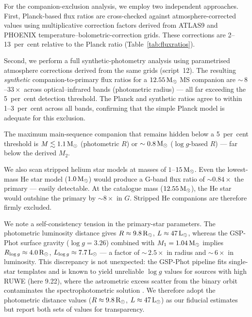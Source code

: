 \documentclass[usenatbib,fleqn]{mnras}
\newcommand{\Msun}{{\rm M}_\odot}
\newcommand{\Lsun}{{\rm L}_\odot}
\newcommand{\Rsun}{{\rm R}_\odot}
\begin{document}
For the companion-exclusion analysis, we employ two independent
approaches.  First, Planck-based flux ratios are cross-checked
against atmosphere-corrected values using multiplicative
correction factors derived from ATLAS9 \citep{Castelli2003} and
PHOENIX \citep{Husser2013} temperature--bolometric-correction
grids.  These corrections are 2--13~per~cent relative to the
Planck ratio (Table~\ref{tab:fluxratios}).

Second, we perform a full synthetic-photometry analysis using
parametrised atmosphere corrections derived from the same grids
(script~12).  The resulting \emph{synthetic} companion-to-primary
flux ratios for a $12.55\,\Msun$ MS companion are
$\sim$\,$8$--$33\times$ across optical--infrared bands
(photometric radius) --- all far exceeding the 5~per~cent
detection threshold.  The Planck and synthetic ratios agree to
within 1--3~per~cent across all bands, confirming that the
simple Planck model is adequate for this exclusion.

The maximum main-sequence companion that remains hidden below a
5~per~cent threshold is $M \lesssim 1.1\,\Msun$
(photometric $R$) or $\sim 0.8\,\Msun$ ($\log g$-based $R$)
--- far below the derived $M_2$.

We also scan stripped helium star models
\citep{Gotberg2018} at masses of $1$--$15\,\Msun$.  Even the
lowest-mass He star model ($1.0\,\Msun$) would produce a
G-band flux ratio of $\sim 0.84\times$ the primary ---
easily detectable.  At the catalogue mass ($12.55\,\Msun$),
the He star would outshine the primary by $\sim 8\times$ in
$G$.  Stripped He companions are therefore firmly excluded.

We note a self-consistency tension in the primary-star parameters.
The photometric luminosity distance gives
$R \approx 9.8\,\Rsun$, $L \approx 47\,\Lsun$, whereas the
GSP-Phot surface gravity ($\log g = 3.26$) combined with
$M_1 = 1.04\,\Msun$ implies
$R_{\log g} \approx 4.0\,\Rsun$, $L_{\log g} \approx 7.7\,\Lsun$
--- a factor of $\sim$\,$2.5\times$ in radius and
$\sim$\,$6\times$ in luminosity.  This discrepancy is not
unexpected: the GSP-Phot pipeline fits single-star templates and
is known to yield unreliable $\log g$ values for sources with
high RUWE (here 9.22), where the astrometric excess scatter from
the binary orbit contaminates the spectrophotometric solution
\citep{Andrae2023}.  We therefore adopt the photometric distance
values ($R \approx 9.8\,\Rsun$, $L \approx 47\,\Lsun$) as our
fiducial estimates but report both sets of values for
transparency.
\end{document}
